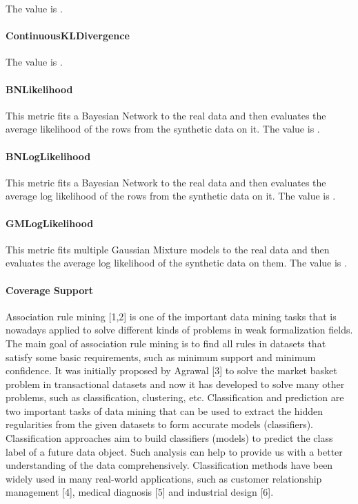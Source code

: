 \documentclass{article}
\begin{document}
The value is .\\

\paragraph{ContinuousKLDivergence}
The value is .\\


\paragraph{BNLikelihood}

This metric fits a Bayesian Network to the real data and then evaluates the average likelihood of the rows from the synthetic data on it. 
The value is .\\

\paragraph{BNLogLikelihood}

This metric fits a Bayesian Network to the real data and then evaluates the average log likelihood of the rows from the synthetic data on it.
The value is .\\


\paragraph{GMLogLikelihood}

This metric fits multiple Gaussian Mixture models to the real data and then evaluates the average log likelihood of the synthetic data on them.
The value is .\\

\paragraph{Coverage Support}
Association rule mining [1,2] is one of the important data mining tasks that is nowadays applied to solve different kinds of problems in weak formalization fields. The main goal of association rule mining is to find all rules in datasets that satisfy some basic requirements, such as minimum support and minimum confidence. It was initially proposed by Agrawal [3] to solve the market basket problem in transactional datasets and now it has developed to solve many other problems, such as classification, clustering, etc. Classification and prediction are two important tasks of data mining that can be used to extract the hidden regularities from the given datasets to form accurate models (classifiers). Classification approaches aim to build classifiers (models) to predict the class label of a future data object. Such analysis can help to provide us with a better understanding of the data comprehensively. Classification methods have been widely used in many real-world applications, such as customer relationship management [4], medical diagnosis [5] and industrial design [6].
\end{document}
